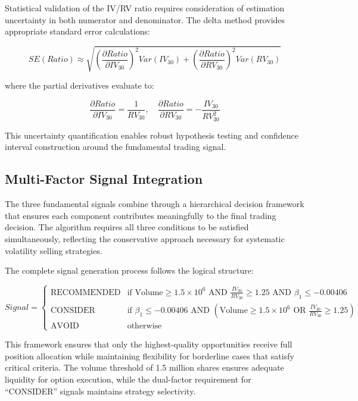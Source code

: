 \documentclass[
  american,
  11pt,
  11pt,
  letterpaper,
  onecolumn]{article}
\begin{document}
Statistical validation of the IV/RV ratio requires consideration of
estimation uncertainty in both numerator and denominator. The delta
method provides appropriate standard error calculations:

\[SE(Ratio) \approx \sqrt{\left(\frac{\partial Ratio}{\partial IV_{30}}\right)^2 Var(IV_{30}) + \left(\frac{\partial Ratio}{\partial RV_{30}}\right)^2 Var(RV_{30})}\]

where the partial derivatives evaluate to:

\[\frac{\partial Ratio}{\partial IV_{30}} = \frac{1}{RV_{30}}, \quad \frac{\partial Ratio}{\partial RV_{30}} = -\frac{IV_{30}}{RV_{30}^2}\]

This uncertainty quantification enables robust hypothesis testing and
confidence interval construction around the fundamental trading signal.

\subsection{Multi-Factor Signal
Integration}\label{multi-factor-signal-integration}

The three fundamental signals combine through a hierarchical decision
framework that ensures each component contributes meaningfully to the
final trading decision. The algorithm requires all three conditions to
be satisfied simultaneously, reflecting the conservative approach
necessary for systematic volatility selling strategies.

The complete signal generation process follows the logical structure:

\[Signal = \begin{cases}
\text{RECOMMENDED} & \text{if } \text{Volume} \geq 1.5 \times 10^6 \text{ AND } \frac{IV_{30}}{RV_{30}} \geq 1.25 \text{ AND } \beta_1 \leq -0.00406 \\
\text{CONSIDER} & \text{if } \beta_1 \leq -0.00406 \text{ AND } (\text{Volume} \geq 1.5 \times 10^6 \text{ OR } \frac{IV_{30}}{RV_{30}} \geq 1.25) \\
\text{AVOID} & \text{otherwise}
\end{cases}\]

This framework ensures that only the highest-quality opportunities
receive full position allocation while maintaining flexibility for
borderline cases that satisfy critical criteria. The volume threshold of
1.5 million shares ensures adequate liquidity for option execution,
while the dual-factor requirement for ``CONSIDER'' signals maintains
strategy selectivity.
\end{document}
